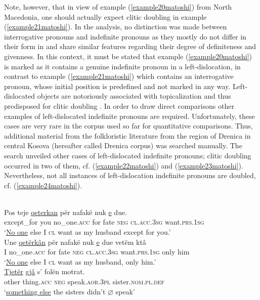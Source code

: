 \documentclass[output=paper]{langsci/langscibook}
\begin{document}
Note, however, that in view of example (\ref{example20matoshi}) from North Macedonia, one should actually expect clitic doubling in example (\ref{example21matoshi}). In the analysis, no distinction was made between interrogative pronouns and indefinite pronouns as they mostly do not differ in their form in  and share similar features regarding their degree of definiteness and givenness. In this context, it must be stated that example (\ref{example20matoshi}) is marked as it contains a genuine indefinite pronoun in a left-dislocation, in contrast to example (\ref{example21matoshi}) which contains an interrogative pronoun, whose initial position is predefined and not marked in any way. Left-dislocated objects are notoriously associated with topicalization and thus predisposed for clitic doubling \citep[40]{Friedman2008}. In order to draw direct comparisons other examples of left-dislocated indefinite pronouns are required. Unfortunately, these cases are very rare in the corpus used so far for quantitative comparisons. Thus, additional material from the folkloristic literature from the region of Drenica in central Kosova (hereafter called Drenica corpus) was searched manually. The search unveiled other cases of left-dislocated indefinite pronouns; clitic doubling occurred in two of them, cf. (\ref{example22matoshi}) and (\ref{example23matoshi}). Nevertheless, not all instances of left-dislocation indefinite pronouns are doubled, cf. (\ref{example24matoshi}).  

\ea \label{example22matoshi} 
	\\
	\gll Pos teje \uline{qeterkan} për nafakë nuk \uline{e} due.\\
	except\_for you no\_one.\textsc{acc} for fate \textsc{neg} \textsc{cl.acc.3sg} want\textsc{.prs.1sg}\\
	\glt ‘\uline{No one} else I \textsc{cl} want as my husband except for you.’
\ex \label{example23matoshi} 
	\\
	\gll Une \uline{qetërkân} për nafakë nuk \uline{e} due vetëm ktâ \\
	I no\_one.\textsc{acc} for fate \textsc{neg} \textsc{cl.acc.3sg} want.\textsc{prs.1sg} only him\\
	\glt ‘\uline{No one} else I \textsc{cl} want as my husband, only him.’
\ex \label{example24matoshi} 
	\\
	\gll \uline{Tjetër} \uline{gjâ} s’ folën motrat.\\
	other thing\textsc{.acc} \textsc{neg} speak.\textsc{aor.3pl} sister.\textsc{nom.pl.def}\\
	\glt ‘\uline{something else} the sisters didn’t $\varnothing$ speak’
 \z
\end{document}
